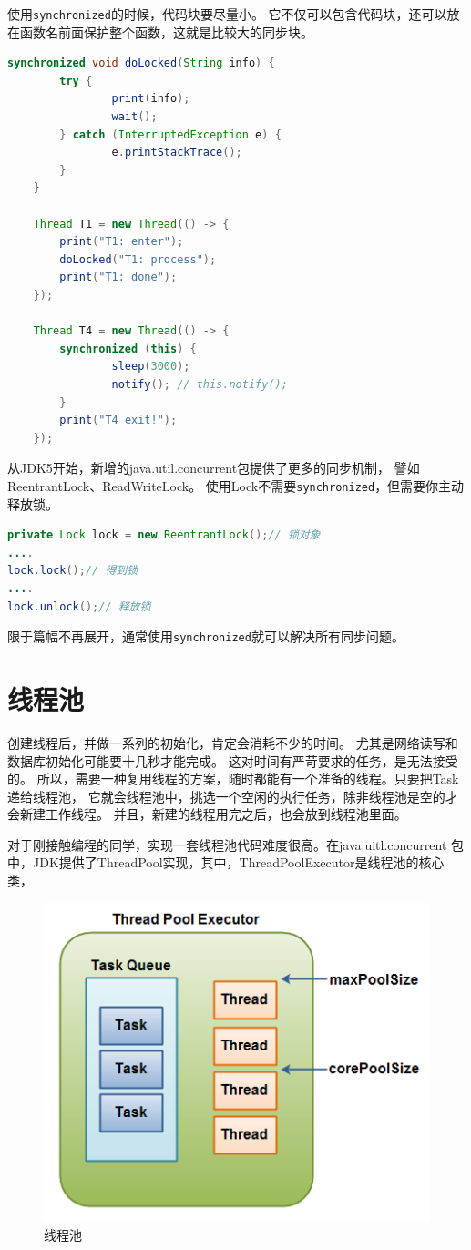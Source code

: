 使用\lstinline{synchronized}的时候，代码块要尽量小。
它不仅可以包含代码块，还可以放在函数名前面保护整个函数，这就是比较大的同步块。

\begin{lstlisting}[language=Java]
	synchronized void doLocked(String info) {
		try {
				print(info);
				wait();
		} catch (InterruptedException e) {
				e.printStackTrace();
		}
	}

	Thread T1 = new Thread(() -> {
		print("T1: enter");
		doLocked("T1: process");
		print("T1: done");
	});

	Thread T4 = new Thread(() -> {
		synchronized (this) {
				sleep(3000);
				notify(); // this.notify();
		}
		print("T4 exit!");
	});
\end{lstlisting}
从JDK5开始，新增的java.util.concurrent包提供了更多的同步机制，
譬如ReentrantLock、ReadWriteLock。
使用Lock不需要\lstinline{synchronized}，但需要你主动释放锁。

\begin{lstlisting}[language=Java]
private Lock lock = new ReentrantLock();// 锁对象
....
lock.lock();// 得到锁
....
lock.unlock();// 释放锁  
\end{lstlisting}

\noindent
限于篇幅不再展开，通常使用\lstinline{synchronized}就可以解决所有同步问题。

\section{线程池}
创建线程后，并做一系列的初始化，肯定会消耗不少的时间。
尤其是网络读写和数据库初始化可能要十几秒才能完成。
这对时间有严苛要求的任务，是无法接受的。
所以，需要一种复用线程的方案，随时都能有一个准备的线程。只要把Task递给线程池，
它就会线程池中，挑选一个空闲的执行任务，除非线程池是空的才会新建工作线程。
并且，新建的线程用完之后，也会放到线程池里面。

对于刚接触编程的同学，实现一套线程池代码难度很高。在java.uitl.concurrent
包中，JDK提供了ThreadPool实现，其中，ThreadPoolExecutor是线程池的核心类，

\begin{figure}[!htb]
\centerline{\includegraphics[width=.25\figwidth]{images/thread-pool-executor.png}}
\label{fig:part1_thread_pool}
\caption{线程池}
\end{figure}

